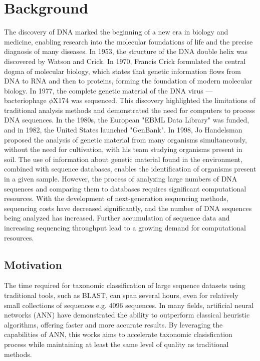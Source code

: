 \documentclass[pdflatex,sn-vancouver-num]{sn-jnl}%
\begin{document}
    \section{Background}
        The discovery of DNA marked the beginning of a new era in biology and medicine, enabling research into the molecular foundations of life and the precise diagnosis of many diseases\cite{Louie:2000}. In 1953, the structure of the DNA double helix was discovered by Watson and Crick\cite{Watson:1953}. In 1970, Francis Crick formulated the central dogma of molecular biology\cite{Crick:1970}, which states that genetic information flows from DNA to RNA and then to proteins, forming the foundation of modern molecular biology. In 1977, the complete genetic material of the DNA virus — bacteriophage $\phi{}$X174 was sequenced\cite{Sanger:1977:2}. This discovery highlighted the limitations of traditional analysis methods and demonstrated the need for computers to process DNA sequences\cite{Staden:1979}. In the 1980s, the European "EBML Data Library" was funded\cite{Higgins:1992}, and in 1982, the United States launched "GenBank"\cite{Bilofsky:1986}. In 1998, Jo Handelsman proposed the analysis of genetic material from many organisms simultaneously, without the need for cultivation, with his team studying organisms present in soil\cite{Handelsman:1998}. The use of information about genetic material found in the environment, combined with sequence databases, enables the identification of organisms present in a given sample. However, the process of analyzing large numbers of DNA sequences and comparing them to databases requires significant computational resources. With the development of next-generation sequencing methods\cite{Reinartz:2002}, sequencing costs have decreased significantly, and the number of DNA sequences being analyzed has increased\cite{Muir:2016}. Further accumulation of sequence data and increasing sequencing throughput lead to a growing demand for computational resources.

        \subsection{Motivation}
            The time required for taxonomic classification of large sequence datasets using traditional tools, such as BLAST, can span several hours, even for relatively small collections of sequences e.g. 4096 sequences. In many fields, artificial neural networks (ANN) have demonstrated the ability to outperform classical heuristic algorithms, offering faster and more accurate results. By leveraging the capabilities of ANN, this works aims to accelerate taxonomic clasisfication process while maintaining at least the same level of quality as traditional methods.
\end{document}
